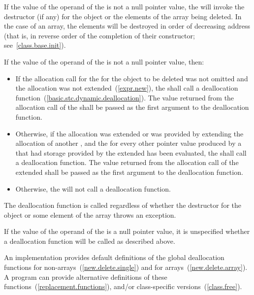 \pnum
{}%
If the value of the operand of the  is not a
null pointer value, the  will invoke the
destructor (if any) for the object or the elements of the array being
deleted. In the case of an array, the elements will be destroyed in
order of decreasing address (that is, in reverse order of the completion
of their constructor; see~\ref{class.base.init}).

\pnum
If the value of the operand of the  is not a
null pointer value, then:

\begin{itemize}
\item
If the allocation call for the  for the object to
be deleted was not omitted and the allocation was not extended~(\ref{expr.new}), the
 shall call a deallocation
function~(\ref{basic.stc.dynamic.deallocation}). The value returned from the
allocation call of the  shall be passed as the
first argument to the deallocation function.

\item
Otherwise, if the allocation was extended or was provided by extending the
allocation of another , and the
 for every other pointer value produced by a
 that had storage provided by the extended
 has been evaluated, the
 shall call a deallocation function. The value
returned from the allocation call of the extended 
shall be passed as the first argument to the deallocation function.

\item
Otherwise, the  will not call a
deallocation function.
\end{itemize}
\begin{note}
The deallocation function is called regardless of whether the destructor
for the object or some element of the array throws an exception.
\end{note}
If the value of the operand of the  is a
null pointer value, it is unspecified whether a deallocation function will be
called as described above.

\pnum
\begin{note}
An implementation provides default definitions of the global
deallocation functions  for
non-arrays~(\ref{new.delete.single}) and
%
%
 for arrays~(\ref{new.delete.array}). A \Cpp
program can provide alternative definitions of these
functions~(\ref{replacement.functions}), and/or class-specific
versions~(\ref{class.free}).
\end{note}

